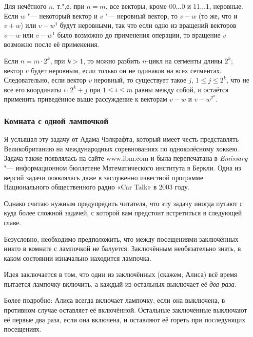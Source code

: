 \documentclass[twoside]{book}
\begin{document}
Для нечётного $n$, т.",е. при $n=m$, все векторы, кроме $00\dots0$ и $11\dots1$, неровные.
Если $w$ "--- некоторый вектор и $v$ "--- неровный вектор, то $v-w$ (то же, что и $v+w$) или $v-w^1$ будут неровными, так что если одно из вращений векторов $v-w$ или $v-w^1$ было возможно до применения операции, то вращение $v$ возможно после её применения.

Если $n=m\cdot 2^k$, при $k>1$, то можно разбить $n$-цикл на сегменты длины $2^k$; вектор $v$ будет неровным, если только он не одинаков на всех сегментах.
Следовательно, если вектор $v$ неровный, то существует такое $j$, $1\le j\le 2^k$, что не все его координаты $i\cdot 2^k+j$ при $1\le i\le m$ равны между собой, и остаётся применить приведённое выше рассуждение к векторам $v-w$ и $v-w^{2^k}$. %

\subsubsection*{Комната с одной лампочкой}%

Я услышал эту задачу от Адама Чэлкрафта, %
который имеет честь представлять Великобританию на международных соревнованиях по одноколёсному хоккею.
Задача также появлялась на сайте www.ibm.com и была перепечатана в \emph{Emissary} "--- информационном бюллетене Математического института в Беркли. %
Одна из версий задачи появлялась даже в заслуженно известной программе Национального общественного радио «Car Talk» в 2003 году.

Однако считаю нужным предупредить читателя, что эту задачу иногда путают с куда более сложной задачей, с которой вам предстоит встретиться в следующей главе.

\medskip

Безусловно, необходимо предположить, что между посещениями заключённых никто в комнате с лампочкой не балуется.
Заключённым необязательно знать, в каком состоянии изначально находится лампочка.

Идея заключается в том, что один из заключённых (скажем, Алиса) всё время пытается лампочку включить, а каждый из остальных выключает её \emph{два раза}.

Более подробно: Алиса всегда включает лампочку, если она выключена, в противном случае оставляет её включённой.
Остальные заключённые выключают её первые два раза, если она включена, и оставляют её гореть при последующих посещениях.
\end{document}

